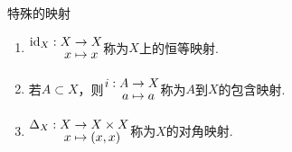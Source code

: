 \begin{definition}{特殊的映射}
    \begin{enumerate}
        \item ${\setjot[-2]\begin{aligned}
            \mathrm{id}_X: X &\to X \\
            x &\mapsto x
        \end{aligned}}$称为$X$上的恒等映射.
        \item 若$A\subset X$，则${\setjot[-2]\begin{aligned}
            i:A &\to X \\
            a &\mapsto a
        \end{aligned}}$称为$A$到$X$的包含映射.
        \item $\setjot[-2]\begin{aligned}
            \Delta_X:X &\to X\times X \\
            x &\mapsto (x,x)
        \end{aligned}$称为$X$的对角映射.
    \end{enumerate}
\end{definition}

